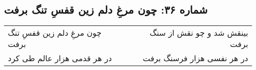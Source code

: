 \begin{center}
\section*{شماره ۳۶: چون مرغِ دلم زین قفسِ تنگ برفت}
\label{sec:036}
\begin{longtable}{l p{0.5cm} r}
چون مرغِ دلم زین قفسِ تنگ برفت
&&
بینقش شد و چو نقش از سنگ برفت
\\
در هر قدمی هزار عالم طی کرد
&&
در هر نفسی هزار فرسنگ برفت
\\
\end{longtable}
\end{center}
